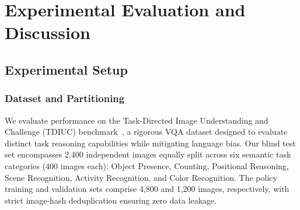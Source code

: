 \section{Experimental Evaluation and Discussion}\label{sec:experiments}

\subsection{Experimental Setup}
\subsubsection{Dataset and Partitioning}
We evaluate performance on the Task-Directed Image Understanding and Challenge (TDIUC) benchmark~\cite{kafle2017tdiuc}, a rigorous VQA dataset designed to evaluate distinct task reasoning capabilities while mitigating language bias. Our blind test set encompasses 2,400 independent images equally split across six semantic task categories (400 images each): Object Presence, Counting, Positional Reasoning, Scene Recognition, Activity Recognition, and Color Recognition. The policy training and validation sets comprise 4,800 and 1,200 images, respectively, with strict image-hash deduplication ensuring zero data leakage.

